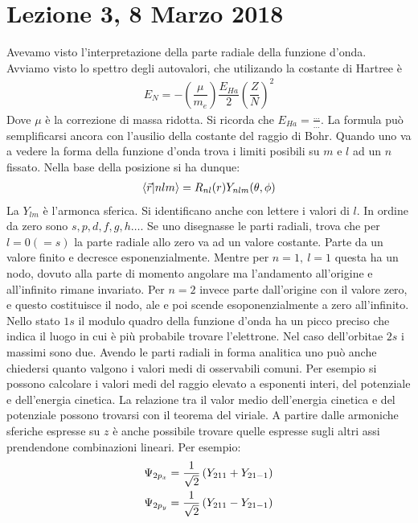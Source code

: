 \documentclass[../AppuntiStruttura.tex]{subfiles}
\begin{document}
	\section{Lezione 3, 8 Marzo 2018}
	
	Avevamo visto l'interpretazione della parte radiale della funzione d'onda. Avviamo visto lo spettro degli autovalori, che utilizando la costante di Hartree è
	\begin{gather*}
	E_N=-\left(\dfrac{\mu}{m_e}\right)\dfrac{E_{Ha}}{2}\left(\dfrac{Z}{N}\right)^{2}
	\end{gather*}
	Dove $ \mu $ è la correzione di massa ridotta. Si ricorda che $ E_{Ha}=\frac{...}{...} $. La formula può semplificarsi ancora con l'ausilio della costante del raggio di Bohr. Quando uno va a vedere la forma della funzione d'onda trova i limiti posibili su $ m $ e $ l $ ad un $ n $ fissato. Nella base della posizione si ha dunque:
	\begin{gather*}
	\braket{\vec{r}}{nlm}=R_{nl}(r)Y_{nlm}(\theta,\phi)
	\end{gather*}
	La $ Y_{lm} $ è l'armonca sferica. Si identificano anche con lettere i valori di $ l $. In ordine da zero sono $ s,p,d,f,g,h\dots $. Se uno disegnasse le parti radiali, trova che per $ l=0(=s) $ la parte radiale allo zero va ad un valore costante. Parte da un valore finito e decresce esponenzialmente. Mentre per $ n=1,\ l=1 $ questa ha un nodo, dovuto alla parte di momento angolare ma l'andamento all'origine e all'infinito rimane invariato. Per $ n=2 $ invece parte dall'origine con il valore zero, e questo costituisce il nodo, ale e poi scende esoponenzialmente a zero all'infinito. Nello stato $ 1s $ il modulo quadro della funzione d'onda ha un picco preciso che indica il luogo in cui è più probabile trovare l'elettrone. Nel caso dell'orbitae $ 2s $ i massimi sono due. Avendo le parti radiali in forma analitica uno può anche chiedersi quanto valgono i valori medi di osservabili comuni. Per esempio si possono calcolare i valori medi del raggio elevato a esponenti interi, del potenziale e dell'energia cinetica. La relazione tra il valor medio dell'energia cinetica e del potenziale possono trovarsi con il teorema del viriale. A partire dalle armoniche sferiche espresse su $ z $ è anche possibile trovare quelle espresse sugli altri assi prendendone combinazioni lineari. Per esempio:
	\begin{gather*}
	\Psi_{2p_x}=\dfrac{1}{\sqrt{2}}\left(Y_{211}+Y_{21-1}\right) \\
	\Psi_{2p_y}=\dfrac{1}{\sqrt{2}}\left(Y_{211}-Y_{21-1}\right)
	\end{gather*}
\end{document}
